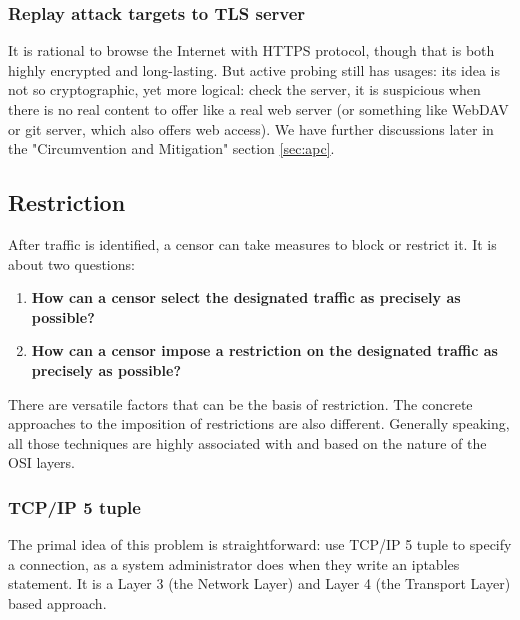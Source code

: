 \documentclass[conference]{IEEEtran}
\begin{document}
\subsubsection{Replay attack targets to TLS server}
It is rational to browse the Internet with HTTPS protocol, though that is both highly encrypted and long-lasting. But active probing still has usages: its idea is not so cryptographic, yet more logical: check the server, it is suspicious when there is no real content to offer like a real web server (or something like WebDAV or git server, which also offers web access). 
We have further discussions later in the "Circumvention and Mitigation" section \ref{sec:apc}.

\subsection{Restriction}
After traffic is identified, a censor can take measures to block or restrict it. 
It is about two questions: 
\begin{enumerate}
    \item \textbf{How can a censor select the designated traffic as precisely as possible?}
    \item \textbf{How can a censor impose a restriction on the designated traffic as precisely as possible?}
\end{enumerate}
There are versatile factors that can be the basis of restriction. The concrete approaches to the imposition of restrictions are also different. Generally speaking, all those techniques are highly associated with and based on the nature of the OSI layers.

\subsubsection{TCP/IP 5 tuple}
The primal idea of this problem is straightforward: use TCP/IP 5 tuple to specify a connection, as a system administrator does when they write an iptables statement. It is a Layer 3 (the Network Layer) and Layer 4 (the Transport Layer) based approach.
\end{document}
